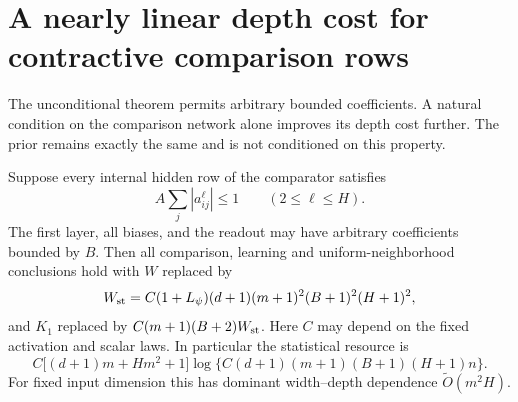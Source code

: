 \section{A nearly linear depth cost for contractive comparison rows}
The unconditional theorem permits arbitrary bounded coefficients. A natural condition on the comparison network alone improves its depth cost further. The prior remains exactly the same and is not conditioned on this property.

\begin{theorem}\label{thm:stable-teachers}
Suppose every internal hidden row of the comparator satisfies
\[
 A\sum_j|a^\ell_{ij}|\le1\qquad(2\le\ell\le H).
\]
The first layer, all biases, and the readout may have arbitrary coefficients bounded by $B$. Then all comparison, learning and uniform-neighborhood conclusions hold with $W$ replaced by
\[
 W_{\rm st}=C(1+L_\psi)(d+1)(m+1)^2(B+1)^2(H+1)^2,
\]
and $K_1$ replaced by $C(m+1)(B+2)W_{\rm st}$. Here $C$ may depend on the fixed activation and scalar laws. In particular the statistical resource is
\[
 C\big[(d+1)m+Hm^2+1\big]
       \log\{C(d+1)(m+1)(B+1)(H+1)n\}.
\]
For fixed input dimension this has dominant width--depth dependence
$\widetilde O(m^2H)$.
\end{theorem}
